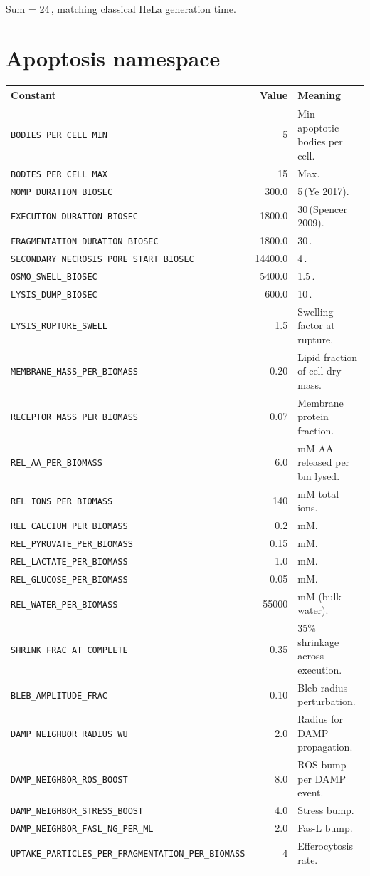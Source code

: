 \documentclass[11pt,letterpaper,twoside,openany]{book}
\newcommand{\code}[1]{\texttt{#1}}
\newcommand{\bioh}{\text{bio-h}}
\newcommand{\biomin}{\text{bio-min}}
\begin{document}
Sum = 24\,\bioh, matching classical HeLa generation time.

\section{Apoptosis namespace}

\begin{longtable}{p{5.0cm}rp{5.5cm}}
\toprule
Constant & Value & Meaning\\ \midrule
\code{BODIES\_PER\_CELL\_MIN} & 5 & Min apoptotic bodies per cell.\\
\code{BODIES\_PER\_CELL\_MAX} & 15 & Max.\\
\code{MOMP\_DURATION\_BIOSEC} & 300.0 & 5\,\biomin (Ye 2017).\\
\code{EXECUTION\_DURATION\_BIOSEC} & 1800.0 & 30\,\biomin (Spencer 2009).\\
\code{FRAGMENTATION\_DURATION\_BIOSEC} & 1800.0 & 30\,\biomin.\\
\code{SECONDARY\_NECROSIS\_PORE\_START\_BIOSEC} & 14400.0 & 4\,\bioh.\\
\code{OSMO\_SWELL\_BIOSEC} & 5400.0 & 1.5\,\bioh.\\
\code{LYSIS\_DUMP\_BIOSEC} & 600.0 & 10\,\biomin.\\
\code{LYSIS\_RUPTURE\_SWELL} & 1.5 & Swelling factor at rupture.\\
\code{MEMBRANE\_MASS\_PER\_BIOMASS} & 0.20 & Lipid fraction of cell dry mass.\\
\code{RECEPTOR\_MASS\_PER\_BIOMASS} & 0.07 & Membrane protein fraction.\\
\code{REL\_AA\_PER\_BIOMASS} & 6.0 & mM AA released per bm lysed.\\
\code{REL\_IONS\_PER\_BIOMASS} & 140 & mM total ions.\\
\code{REL\_CALCIUM\_PER\_BIOMASS} & 0.2 & mM.\\
\code{REL\_PYRUVATE\_PER\_BIOMASS} & 0.15 & mM.\\
\code{REL\_LACTATE\_PER\_BIOMASS} & 1.0 & mM.\\
\code{REL\_GLUCOSE\_PER\_BIOMASS} & 0.05 & mM.\\
\code{REL\_WATER\_PER\_BIOMASS} & 55000 & mM (bulk water).\\
\code{SHRINK\_FRAC\_AT\_COMPLETE} & 0.35 & 35\% shrinkage across execution.\\
\code{BLEB\_AMPLITUDE\_FRAC} & 0.10 & Bleb radius perturbation.\\
\code{DAMP\_NEIGHBOR\_RADIUS\_WU} & 2.0 & Radius for DAMP propagation.\\
\code{DAMP\_NEIGHBOR\_ROS\_BOOST} & 8.0 & ROS bump per DAMP event.\\
\code{DAMP\_NEIGHBOR\_STRESS\_BOOST} & 4.0 & Stress bump.\\
\code{DAMP\_NEIGHBOR\_FASL\_NG\_PER\_ML} & 2.0 & Fas-L bump.\\
\code{UPTAKE\_PARTICLES\_PER\_FRAGMENTATION\_PER\_BIOMASS} & 4 & Efferocytosis rate.\\
\bottomrule
\end{longtable}
\end{document}
